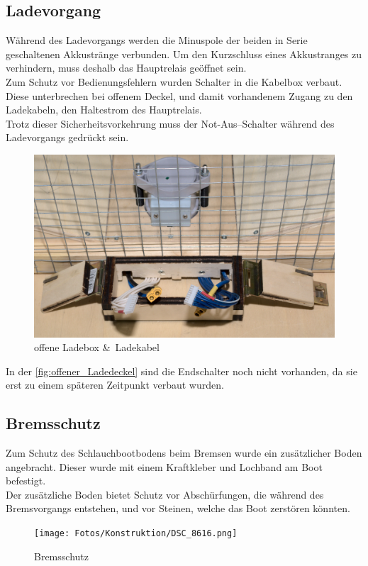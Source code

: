 \subsection{Ladevorgang}
Während des Ladevorgangs werden die Minuspole der beiden in Serie geschaltenen Akkustränge verbunden. Um den Kurzschluss eines Akkustranges zu verhindern, muss deshalb das Hauptrelais geöffnet sein.\\
Zum Schutz vor Bedienungsfehlern wurden Schalter in die Kabelbox verbaut. Diese unterbrechen bei offenem Deckel, und damit vorhandenem Zugang zu den Ladekabeln, den Haltestrom des Hauptrelais.\\
Trotz dieser Sicherheitsvorkehrung muss der Not-Aus--Schalter während des Ladevorgangs gedrückt sein.
\begin{figure}[H]
    \centering
    \includegraphics[width=\textwidth]{Fotos/Ladedeckel_DSC_8794.png}
    \caption{offene Ladebox \&\ Ladekabel \label{fig:offener_Ladedeckel}}    
\end{figure}

In der \autoref{fig:offener_Ladedeckel} sind die Endschalter noch nicht vorhanden, da sie erst zu einem späteren Zeitpunkt verbaut wurden. 

\clearpage
\subsection{Bremsschutz}
Zum Schutz des Schlauchbootbodens beim Bremsen wurde ein zusätzlicher Boden angebracht. Dieser wurde mit einem Kraftkleber und Lochband am Boot befestigt.\\
Der zusätzliche Boden bietet Schutz vor Abschürfungen, die während des Bremsvorgangs entstehen, und vor Steinen, welche das Boot zerstören könnten.
\begin{figure}[H]
    \centering
    \texttt{[image: Fotos/Konstruktion/DSC\_8616.png]}
    \caption{Bremsschutz}    
\end{figure}


